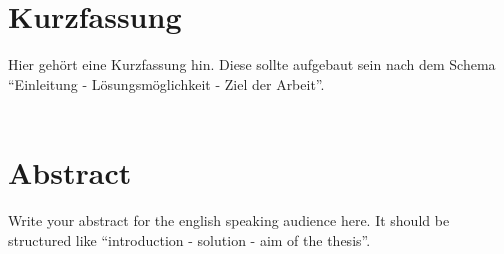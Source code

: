 \chapter*{Kurzfassung}
Hier gehört eine Kurzfassung hin. Diese sollte aufgebaut sein nach dem Schema \enquote{Einleitung - Lösungsmöglichkeit - Ziel der Arbeit}.\\ \\


\chapter*{Abstract}
Write your abstract for the english speaking audience here. It should be structured like \enquote{introduction - solution - aim of the thesis}.

